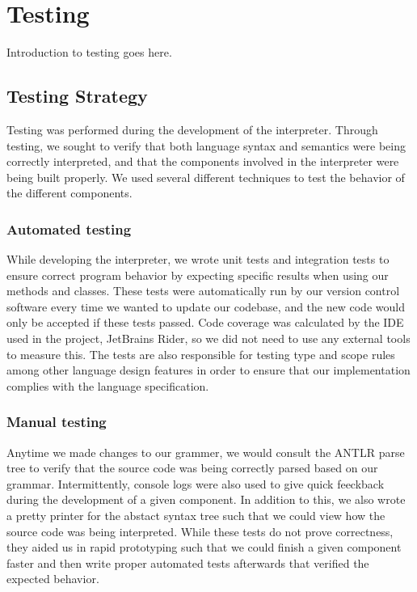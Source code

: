\chapter{Testing}

Introduction to testing goes here.

\section{Testing Strategy}
Testing was performed during the development of the \dazel{} interpreter. 
Through testing, we sought to verify that both language syntax and semantics were being correctly interpreted, and that the components involved in the interpreter were being built properly.
We used several different techniques to test the behavior of the different components. 

\subsection*{Automated testing}
While developing the interpreter, we wrote unit tests and integration tests to ensure correct program behavior by expecting specific results when using our methods and classes. 
These tests were automatically run by our version control software every time we wanted to update our codebase, and the new code would only be accepted if these tests passed.
Code coverage was calculated by the IDE used in the project, JetBrains Rider, so we did not need to use any external tools to measure this\cite{rider_test_coverage}.
The tests are also responsible for testing type and scope rules among other language design features in order to ensure that our implementation complies with the language specification.

\subsection*{Manual testing}
Anytime we made changes to our grammer, we would consult the ANTLR parse tree to verify that the source code was being correctly parsed based on our grammar. 
Intermittently, console logs were also used to give quick feeckback during the development of a given component.
In addition to this, we also wrote a pretty printer for the abstact syntax tree such that we could view how the source code was being interpreted.
While these tests do not prove correctness, they aided us in rapid prototyping such that we could finish a given component faster and then write proper automated tests afterwards that verified the expected behavior.  

